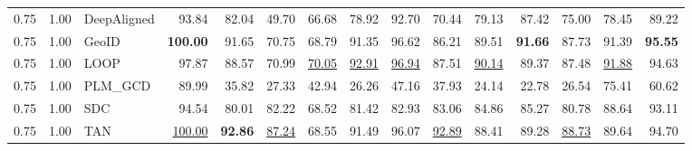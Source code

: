 \begin{table}[t]
{\begin{tabular}{lllrrrrrrrrrrrr}
0.75 & 1.00 & DeepAligned & 93.84 & 82.04 & 49.70 & 66.68 & 78.92 & 92.70 & 70.44 & 79.13 & 87.42 & 75.00 & 78.45 & 89.22 \\
0.75 & 1.00 & GeoID & \textbf{100.00} & 91.65 & 70.75 & 68.79 & 91.35 & 96.62 & 86.21 & 89.51 & \textbf{91.66} & 87.73 & 91.39 & \textbf{95.55} \\
0.75 & 1.00 & LOOP & 97.87 & 88.57 & 70.99 & \underline{70.05} & \underline{92.91} & \underline{96.94} & 87.51 & \underline{90.14} & 89.37 & 87.48 & \underline{91.88} & 94.63 \\
0.75 & 1.00 & PLM_GCD & 89.99 & 35.82 & 27.33 & 42.94 & 26.26 & 47.16 & 37.93 & 24.14 & 22.78 & 26.54 & 75.41 & 60.62 \\
0.75 & 1.00 & SDC & 94.54 & 80.01 & 82.22 & 68.52 & 81.42 & 82.93 & 83.06 & 84.86 & 85.27 & 80.78 & 88.64 & 93.11 \\
0.75 & 1.00 & TAN & \underline{100.00} & \textbf{92.86} & \underline{87.24} & 68.55 & 91.49 & 96.07 & \underline{92.89} & 88.41 & 89.28 & \underline{88.73} & 89.64 & 94.70 \\
\bottomrule
\end{tabular}}
\end{table}